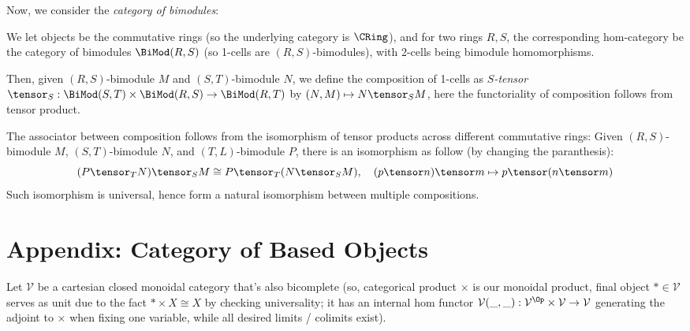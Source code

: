 \documentclass{article}
\begin{document}
\begin{exmp}
    Now, we consider the \emph{category of bimodules}:
    
    We let objects be the commutative rings (so the underlying category is $\CRing$), and for two rings $R,S$, the corresponding hom-category be the category of bimodules $\BiMod(R,S)$ (so 1-cells are $(R,S)$-bimodules), with 2-cells being bimodule homomorphisms.

    Then, given $(R,S)$-bimodule $M$ and $(S,T)$-bimodule $N$, we define the composition of 1-cells as \emph{$S$-tensor} $\tensor_S:\BiMod(S,T)\times \BiMod(R,S)\rightarrow\BiMod(R,T)$ by $(N,M)\mapsto N\tensor_S M$, here the functoriality of composition follows from tensor product. 

    The associator between composition follows from the isomorphism of tensor products across different commutative rings: Given $(R,S)$-bimodule $M$, $(S,T)$-bimodule $N$, and $(T,L)$-bimodule $P$, there is an isomorphism as follow (by changing the paranthesis):
    \[(P\tensor_T N)\tensor_S M \cong P\tensor_T (N\tensor_S M),\quad (p\tensor n)\tensor m\mapsto p\tensor (n\tensor m)\]
    Such isomorphism is universal, hence form a natural isomorphism between multiple compositions.
\end{exmp}

\newpage

\section{Appendix: Category of Based Objects}

Let $\mathcal{V}$ be a cartesian closed monoidal category that's also bicomplete (so, categorical product $\times$ is our monoidal product, final object $*\in\mathcal{V}$ serves as unit due to the fact $*\times X\cong X$ by checking universality; it has an internal hom functor $\mathcal{V}(\_,\_):\mathcal{V}^\Op\times \mathcal{V}\rightarrow\mathcal{V}$ generating the adjoint to $\times$ when fixing one variable, while all desired limits / colimits exist).
\end{document}
